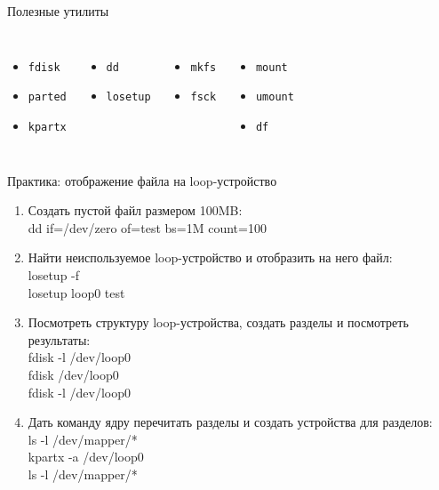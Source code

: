 \begin{frame}{Полезные утилиты}
	\begin{columns}
		\begin{itemize}
			\item {\tt fdisk}
			\item {\tt parted}
			\item {\tt kpartx}
		\end{itemize}
		\begin{itemize}
			\item {\tt dd}
			\item {\tt losetup}
		\end{itemize}
		\begin{itemize}
			\item {\tt mkfs}
			\item {\tt fsck}
		\end{itemize}
		\begin{itemize}
			\item {\tt mount}
			\item {\tt umount}
			\item {\tt df}
		\end{itemize}
	\end{columns}

\end{frame}


\begin{frame}{Практика: отображение файла на loop-устройство}
	\begin{enumerate}
		\item Создать пустой файл размером 100MB: \\
			dd if=/dev/zero of=test bs=1M count=100
			\pause
		\item Найти неиспользуемое loop-устройство и отобразить на него файл:\\
			losetup -f \\
			losetup loop0 test
			\pause
		\item Посмотреть структуру loop-устройства, создать разделы и посмотреть результаты:\\
			fdisk -l /dev/loop0 \\
			fdisk /dev/loop0 \\
			fdisk -l /dev/loop0
			\pause
		\item Дать команду ядру перечитать разделы и создать устройства для разделов:\\
			ls -l /dev/mapper/* \\
			kpartx -a /dev/loop0 \\
			ls -l /dev/mapper/* \\
	\end{enumerate}
\end{frame}

